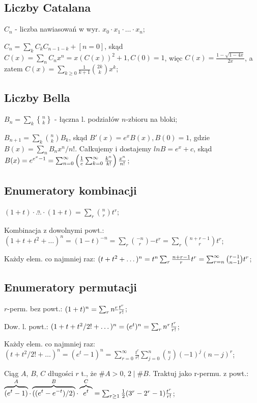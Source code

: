 \subsection{Liczby Catalana}

\entry
$C_n$ - liczba nawiasowań w wyr. $x_0 \cdot x_1 \cdot \dots \cdot x_n$;

\entry
$C_n = \sum_kC_kC_{n-1-k} + [n=0]$,
  skąd $C(x) = \sum_n C_nx^n = x(C(x))^2 + 1, C(0) = 1$,
  więc $C(x) = \frac{1 - \sqrt{1-4x}}{2x}$, a zatem $C(x) =
  \sum_{k\geq 0} \frac{1}{k+1}\binom{2k}{k}x^k$;

\subsection{Liczby Bella}

\entry
${B_n = \sum_k{n \brace k}}$ - łączna l. podziałów $n$-zbioru na bloki;

\entry
${B_{n+1} = \sum_k \binom{n}{k} B_k}$, skąd $B'(x) = e^xB(x), B(0) = 1$,
  gdzie $B(x) = \sum_n B_nx^n/n!$. Całkujemy i dostajemy $ln B = e^x + c$,
  skąd $B(x) = e^{e^x-1} =
  \sum_{n=0}^\infty \left ( {1 \over e} \sum_{k=0}^\infty {k^n \over k!}\right)
  {x^n \over n!}$;

\subsection{Enumeratory kombinacji}

\entry
$(1+t)\cdot\overset{n}{\ldots}\cdot(1+t) = \sum_r\binom{n}{r}t^r$;

\entry
Kombinacja z dowolnymi powt.: $(1+t+t^2+\dots)^n=(1-t)^{-n}=
  \sum_r\binom{-n}{r}{-t}^r=\sum_r\binom{n+r-1}{r}t^r$;

\entry
Każdy elem. co najmniej raz: $(t+t^2+\dots)^n = t^n\sum_r {n+r-1 \over r}t^r =
  \sum^\infty_{r=n}\binom{r-1}{n-1}t^r$;

\subsection{Enumeratory permutacji}

\entry
$r$-perm. bez powt.: $(1+t)^n = \sum_rn^{\underline{r}}{t^r \over r!}$;

\entry
Dow. l. powt.: ${(1+t+t^2/2! + \dots)^n} = {(e^{t})^n} =
  {\sum_rn^r{t^r \over r!}}$;

\entry
Każdy elem. co najmniej raz: $(t + t^2/2! + \dots)^n = (e^t - 1)^n =
  \sum^\infty_{r=0}\frac{t^r}{r!}\sum^n_{j=0}\binom{n}{j}(-1)^j(n-j)^r$;

\entry
Ciąg $A$, $B$, $C$ długości $r$ t., że $\#A>0$, $2\mid\#B$. Traktuj jako r-permu.
  z powt.:
  $\overbrace{(e^t - 1)}^A\cdot\overbrace{((e^t - e^{-t})/2)}^B
  \cdot\overbrace{e^t}^C =
  \sum_{r \geq 1} {1 \over 2}(3^r - 2^r - 1){t^r \over r!}$;
